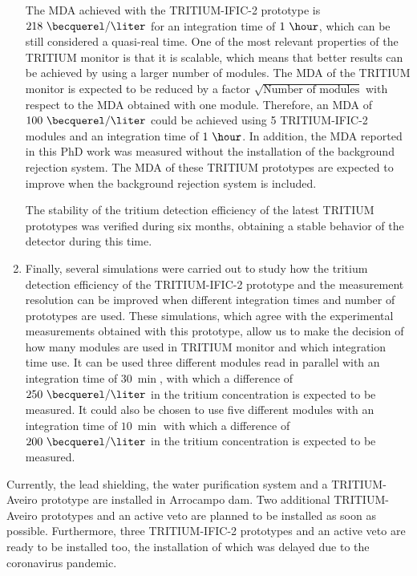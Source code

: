 \begin{enumerate}
\begin{itemize}
\end{itemize}

The MDA achieved with the TRITIUM-IFIC-2 prototype is $218~\becquerel/\liter$ for an integration time of $1~\hour$, which can be still considered a quasi-real time. One of the most relevant properties of the TRITIUM monitor is that it is scalable, which means that better results can be achieved by using a larger number of modules. The MDA of the TRITIUM monitor is expected to be reduced by a factor $\sqrt{\text{Number of modules}}$ with respect to the MDA obtained with one module. Therefore, an MDA of  $100~\becquerel/\liter$ could be achieved using 5 TRITIUM-IFIC-2 modules and an integration time of $1~\hour$. In addition, the MDA reported in this PhD work was measured without the installation of the background rejection system. The MDA of these TRITIUM prototypes are expected to improve when the background rejection system is included.

The stability of the tritium detection efficiency of the latest TRITIUM prototypes was verified during six months, obtaining a stable behavior of the detector during this time.

\item{} Finally, several simulations were carried out to study how the tritium detection efficiency of the TRITIUM-IFIC-2 prototype and the measurement resolution can be improved when different integration times and number of prototypes are used. These simulations, which agree with the experimental measurements obtained with this prototype, allow us to make the decision of how many modules are used in TRITIUM monitor and which integration time use. It can be used three different modules read in parallel with an integration time of $30~\min$, with which a difference of $250~\becquerel/\liter$ in the tritium concentration is expected to be measured. It could also be chosen to use five different modules with an integration time of $10~\min$ with which a difference of $200~\becquerel/\liter$ in the tritium concentration is expected to be measured.

\end{enumerate}

Currently, the lead shielding, the water purification system and a TRITIUM-Aveiro prototype are installed in Arrocampo dam. Two additional TRITIUM-Aveiro prototypes and an active veto are planned to be installed as soon as possible. Furthermore, three TRITIUM-IFIC-2 prototypes and an active veto are ready to be installed too, the installation of which was delayed due to the coronavirus pandemic.